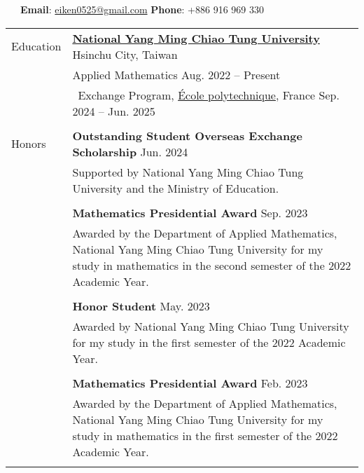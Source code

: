 \documentclass[letterpaper, 11pt]{article}
\begin{document}


\vspace{0.5cm}
\noindent\:\ \ \ 
\textbf{Email}: \href{mailto:eiken0525@gmail.com}{eiken0525@gmail.com} 
\hfill
\textbf{Phone}: +886 916 969 330\ \ \ \ 
\vspace{0.2cm}


\setlength{\tabcolsep}{8pt}
\vspace{-1.5em}
\begin{center}
    \begin{longtable}{p{0.81in}p{5.88in}}
        
        
        \textcolor{OliveGreen}{Education} 
        & \href{https://www.nycu.edu.tw/nycu/en/index}{\textbf{National Yang Ming Chiao Tung University}} \hfill Hsinchu City, Taiwan \\ 
        & Applied Mathematics 
            \hfill Aug. 2022 -- Present \\
        & \qquad \  Exchange Program, \href{https://www.polytechnique.edu}{\'Ecole polytechnique}, France \hfill Sep. 2024 -- Jun. 2025 \\
        & \\
        
        
        
        {\textcolor{OliveGreen}{Honors}} & \textbf{Outstanding Student Overseas Exchange Scholarship} \hfill Jun. 2024\\
        & Supported by National Yang Ming Chiao Tung University and the Ministry of Education. \\
        & \\
        & \textbf{Mathematics Presidential Award} \hfill Sep. 2023\\
        & Awarded by the Department of Applied Mathematics, National Yang Ming Chiao Tung University for my study in mathematics in the second semester of the 2022 Academic Year.\\
        & \\
        & \textbf{Honor Student} \hfill May. 2023\\
        & Awarded by National Yang Ming Chiao Tung University for my study in the first semester of the 2022 Academic Year. \\
        & \\
        & \textbf{Mathematics Presidential Award} \hfill Feb. 2023\\
        & Awarded by the Department of Applied Mathematics, National Yang Ming Chiao Tung University for my study in mathematics in the first semester of the 2022 Academic Year.\\
        & \\


\end{longtable}
\end{center}
\end{document}
